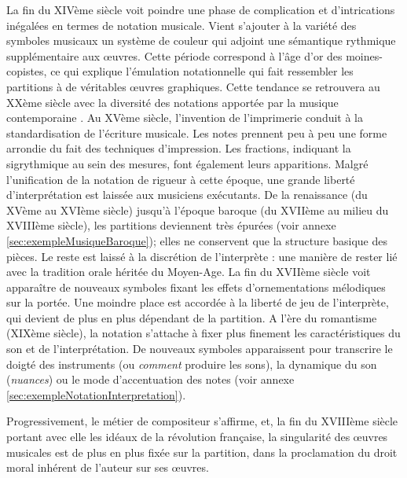 La fin du XIVème siècle voit poindre \og une phase de complication et d'intrications inégalées \fg \cite[43]{bosseur2005} en termes de notation musicale. Vient s'ajouter à la variété des symboles musicaux un système de couleur qui adjoint une sémantique rythmique supplémentaire aux œuvres.
Cette période correspond à l'âge d'or des moines-copistes, ce qui explique l'émulation notationnelle qui fait ressembler les partitions à de véritables œuvres graphiques. Cette tendance se retrouvera au XXème siècle avec la diversité des notations apportée par la musique contemporaine \cite[44]{bosseur2005}. 
Au XVème siècle, l'invention de l'imprimerie conduit à la standardisation de l'écriture musicale. Les notes prennent peu à peu une forme arrondie du fait des techniques d'impression. Les fractions, indiquant la \gls{sigrythmique} au sein des mesures, font également leurs apparitions. 
Malgré l'unification de la notation de rigueur à cette époque, une grande liberté d'interprétation est laissée aux musiciens exécutants. De la renaissance (du XVème au XVIème siècle) jusqu'à l'époque baroque (du XVIIème au milieu du XVIIIème siècle), les partitions deviennent très épurées (voir annexe \ref{sec:exempleMusiqueBaroque}); elles ne conservent que la structure basique des pièces. Le reste est laissé à la discrétion de l'interprète : une manière de rester lié avec la tradition orale héritée du Moyen-Age.
La fin du XVIIème siècle voit apparaître de nouveaux symboles fixant les effets d'ornementations mélodiques sur la portée. Une moindre place est accordée à la liberté de jeu de l'interprète, qui devient de plus en plus dépendant de la partition.
A l'ère du romantisme (XIXème siècle), la notation s'attache à fixer plus finement les caractéristiques du son et de l'interprétation. De nouveaux symboles apparaissent pour transcrire le doigté des instruments (ou \textit{comment} produire les sons), la dynamique du son (\textit{nuances}) ou le mode d'accentuation des notes (voir annexe \ref{sec:exempleNotationInterpretation}).

Progressivement, le métier de compositeur s'affirme, et, la fin du XVIIIème siècle portant avec elle les idéaux de la révolution française, la singularité des œuvres musicales est de plus en plus fixée sur la partition, dans la proclamation du droit moral inhérent de l'auteur sur ses œuvres.

